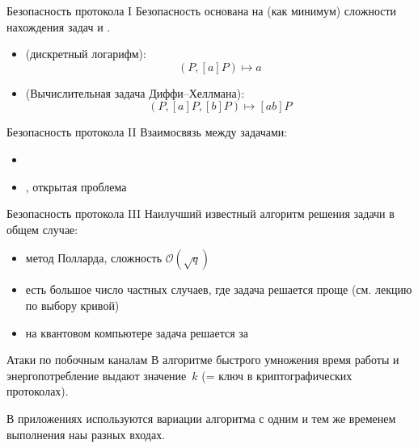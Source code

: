 \documentclass{beamer}
\begin{document}
	\begin{frame}{Безопасность протокола I}
		 Безопасность основана на (как минимум) сложности нахождения задач  и .
		 
		 \vspace{1em}
		\begin{itemize}
			\item {} (дискретный логарифм):
			\[(P, [a]P) \mapsto a\]
			\item {} (Вычислительная задача Диффи–Хеллмана):
			\[(P, [a]P, [b]P) \mapsto [a b] P\]
		\end{itemize}
	\end{frame}
	
	\begin{frame}{Безопасность протокола II}
		Взаимосвязь между задачами:
		\begin{itemize}
			\item {} \structure{$\implies$} 
			\item {} \structure{$\implies$} , открытая проблема
		\end{itemize}
	\end{frame}
	
	\begin{frame}{Безопасность протокола III}
		Наилучший известный алгоритм решения задачи  в общем случае:
		\begin{itemize}
			\item метод Полларда, сложность $\mathcal{O}(\sqrt{q})$
			\item есть большое число частных случаев, где задача решается проще (см. лекцию по выбору кривой)
			\item на квантовом компьютере задача  решается за~
		\end{itemize}
	\end{frame}

	\begin{frame}{Атаки по побочным каналам}
		В алгоритме быстрого умножения время работы и энергопотребление выдают значение~$k$ (= ключ в криптографических протоколах).
		
		\vspace{1em}
		
		В приложениях используются вариации алгоритма с одним и тем же временем выполнения наы разных входах.
	\end{frame}
	
\end{document}
